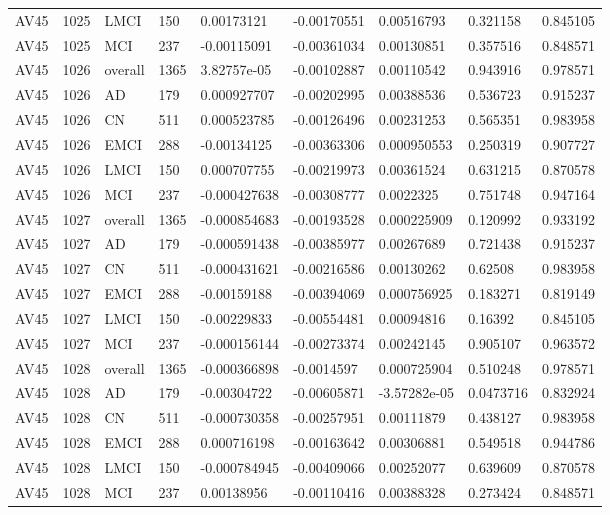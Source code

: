 \begin{landscape}
\begin{longtable}{lllllllll}
AV45 & 1025 & LMCI & 150 & 0.00173121 & -0.00170551 & 0.00516793 & 0.321158 & 0.845105 \\
AV45 & 1025 & MCI & 237 & -0.00115091 & -0.00361034 & 0.00130851 & 0.357516 & 0.848571 \\
AV45 & 1026 & overall & 1365 & 3.82757e-05 & -0.00102887 & 0.00110542 & 0.943916 & 0.978571 \\
AV45 & 1026 & AD & 179 & 0.000927707 & -0.00202995 & 0.00388536 & 0.536723 & 0.915237 \\
AV45 & 1026 & CN & 511 & 0.000523785 & -0.00126496 & 0.00231253 & 0.565351 & 0.983958 \\
AV45 & 1026 & EMCI & 288 & -0.00134125 & -0.00363306 & 0.000950553 & 0.250319 & 0.907727 \\
AV45 & 1026 & LMCI & 150 & 0.000707755 & -0.00219973 & 0.00361524 & 0.631215 & 0.870578 \\
AV45 & 1026 & MCI & 237 & -0.000427638 & -0.00308777 & 0.0022325 & 0.751748 & 0.947164 \\
AV45 & 1027 & overall & 1365 & -0.000854683 & -0.00193528 & 0.000225909 & 0.120992 & 0.933192 \\
AV45 & 1027 & AD & 179 & -0.000591438 & -0.00385977 & 0.00267689 & 0.721438 & 0.915237 \\
AV45 & 1027 & CN & 511 & -0.000431621 & -0.00216586 & 0.00130262 & 0.62508 & 0.983958 \\
AV45 & 1027 & EMCI & 288 & -0.00159188 & -0.00394069 & 0.000756925 & 0.183271 & 0.819149 \\
AV45 & 1027 & LMCI & 150 & -0.00229833 & -0.00554481 & 0.00094816 & 0.16392 & 0.845105 \\
AV45 & 1027 & MCI & 237 & -0.000156144 & -0.00273374 & 0.00242145 & 0.905107 & 0.963572 \\
AV45 & 1028 & overall & 1365 & -0.000366898 & -0.0014597 & 0.000725904 & 0.510248 & 0.978571 \\
AV45 & 1028 & AD & 179 & -0.00304722 & -0.00605871 & -3.57282e-05 & 0.0473716 & 0.832924 \\
AV45 & 1028 & CN & 511 & -0.000730358 & -0.00257951 & 0.00111879 & 0.438127 & 0.983958 \\
AV45 & 1028 & EMCI & 288 & 0.000716198 & -0.00163642 & 0.00306881 & 0.549518 & 0.944786 \\
AV45 & 1028 & LMCI & 150 & -0.000784945 & -0.00409066 & 0.00252077 & 0.639609 & 0.870578 \\
AV45 & 1028 & MCI & 237 & 0.00138956 & -0.00110416 & 0.00388328 & 0.273424 & 0.848571 \\

\end{longtable}
\end{landscape}
